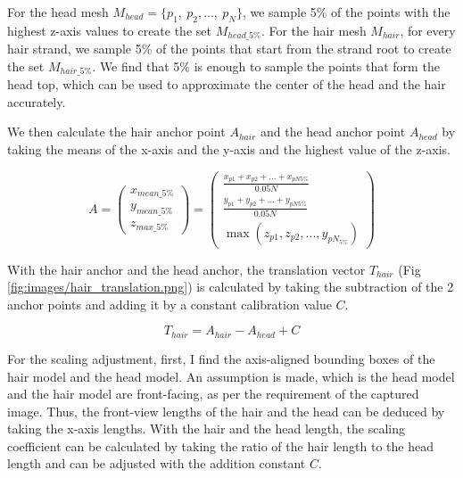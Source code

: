 For the head mesh $M_{head}=\{p_1,\ p_2,...,\ p_N\}$, we sample 5\% of the points with the highest z-axis values to create the set $M_{head\_5\%}$. For the hair mesh $M_{hair}$, for every hair strand, we sample 5\% of the points that start from the strand root to create the set $M_{hair\_5\%}$. We find that 5\% is enough to sample the points that form the head top, which can be used to approximate the center of the head and the hair accurately.


We then calculate the hair anchor point $A_{hair}$ and the head anchor point $A_{head}$ by taking the means of the x-axis and the y-axis and the highest value of the z-axis.

\begin{equation}
    A = \begin{pmatrix}
        x_{mean\_5\%} \\
        y_{mean\_5\%} \\
        z_{max\_5\%}
    \end{pmatrix}
    = \begin{pmatrix}
        \frac{x_{p1}+x_{p2}+...+x_{pN5\%}}{0.05N} \\
        \frac{y_{p1}+y_{p2}+...+y_{pN5\%}}{0.05N} \\
        \max(z_{p1},z_{p2},...,y_{pN_{5\%}})
    \end{pmatrix}
\end{equation}

With the hair anchor and the head anchor, the translation vector $T_{hair}$ (Fig \ref{fig:images/hair_translation.png}) is calculated by taking the subtraction of the 2 anchor points and adding it by a constant calibration value $C$.

\begin{equation}
    T_{hair} = A_{hair} - A_{head} + C
\end{equation}

For the scaling adjustment, first, I find the axis-aligned bounding boxes of the hair model and the head model. An assumption is made, which is the head model and the hair model are front-facing, as per the requirement of the captured image. Thus, the front-view lengths of the hair and the head can be deduced by taking the x-axis lengths. With the hair and the head length, the scaling coefficient can be calculated by taking the ratio of the hair length to the head length and can be adjusted with the addition constant $C$.

